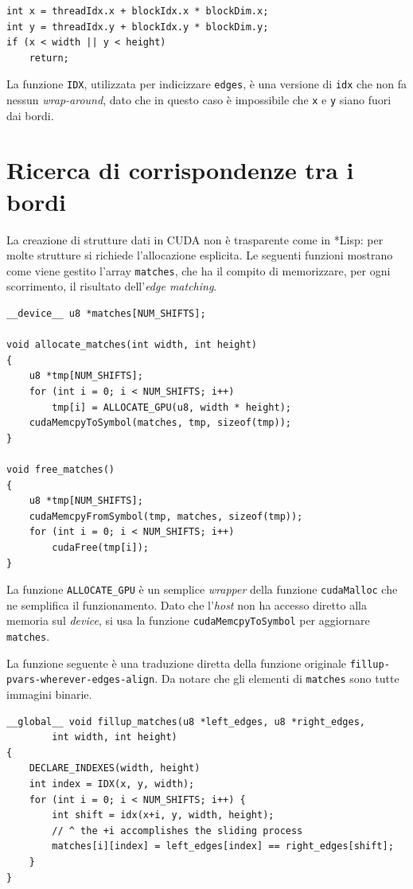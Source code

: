 \documentclass[12pt,a4paper,openright,twoside]{report}
\begin{document}
\begin{lstlisting}
int x = threadIdx.x + blockIdx.x * blockDim.x;
int y = threadIdx.y + blockIdx.y * blockDim.y;
if (x < width || y < height)
    return;
\end{lstlisting}

La funzione \verb|IDX|, utilizzata per indicizzare \verb|edges|, è una versione di \verb|idx| che non fa nessun \textit{wrap-around}, dato che in questo caso è impossibile che \verb|x| e \verb|y| siano fuori dai bordi.

\section{Ricerca di corrispondenze tra i bordi}

La creazione di strutture dati in CUDA non è trasparente come in *Lisp: per molte strutture si richiede l'allocazione esplicita. Le seguenti funzioni mostrano come viene gestito l'array \verb|matches|, che ha il compito di memorizzare, per ogni scorrimento, il risultato dell'\textit{edge matching}.

\begin{lstlisting}[style=mystyle]
__device__ u8 *matches[NUM_SHIFTS];

void allocate_matches(int width, int height)
{
    u8 *tmp[NUM_SHIFTS];
    for (int i = 0; i < NUM_SHIFTS; i++)
        tmp[i] = ALLOCATE_GPU(u8, width * height);
    cudaMemcpyToSymbol(matches, tmp, sizeof(tmp));
}

void free_matches()
{
    u8 *tmp[NUM_SHIFTS];
    cudaMemcpyFromSymbol(tmp, matches, sizeof(tmp));
    for (int i = 0; i < NUM_SHIFTS; i++)
        cudaFree(tmp[i]);
}
\end{lstlisting}

La funzione \verb|ALLOCATE_GPU| è un semplice \textit{wrapper} della funzione \verb|cudaMalloc| che ne semplifica il funzionamento. Dato che l'\textit{host} non ha accesso diretto alla memoria sul \textit{device}, si usa la funzione \verb|cudaMemcpyToSymbol| per aggiornare \verb|matches|.

La funzione seguente è una traduzione diretta della funzione originale \verb|fillup-pvars-wherever-edges-align|. Da notare che gli elementi di \verb|matches| sono tutte immagini binarie.

\begin{lstlisting}[style=mystyle]
__global__ void fillup_matches(u8 *left_edges, u8 *right_edges,
        int width, int height)
{
    DECLARE_INDEXES(width, height)
    int index = IDX(x, y, width);
    for (int i = 0; i < NUM_SHIFTS; i++) {
        int shift = idx(x+i, y, width, height);
        // ^ the +i accomplishes the sliding process
        matches[i][index] = left_edges[index] == right_edges[shift];
    }
}
\end{lstlisting}
\end{document}
